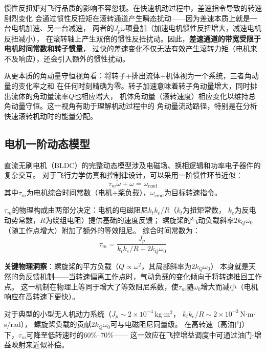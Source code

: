 惯性反扭矩对飞行品质的影响不容忽视。在快速机动过程中，差速指令导致的转速剧烈变化
会通过惯性反扭矩在滚转通道产生瞬态扰动——因为差速本质上就是一台电机加速、另一台减速，
两者的$J_p \dot{\omega}$项叠加（加速电机惯性反扭增大，减速电机反扭减小），
在滚转轴上产生双倍的惯性反扭扰动。因此，\textbf{差速通道的带宽受限于电机时间常数和转子惯量}，
过快的差速变化不仅无法有效产生滚转力矩（电机来不及响应），还会引入额外的惯性扰动。

从更本质的角动量守恒视角看：将转子+排出流体+机体视为一个系统，三者角动量的变化率之和
在任何时刻精确为零。转子加速意味着转子角动量增大，同时排出流体的角动量流率$Q$也相应增大，
机体角动量（滚转速度）相应变化以维持总角动量守恒。这一视角有助于理解机动过程中的
角动量流动路径，特别是在分析快速滚转机动时的能量分配。

\subsection{电机一阶动态模型}

直流无刷电机（BLDC）的完整动态模型涉及电磁场、换相逻辑和功率电子器件的复杂交互。
对于飞行力学仿真和控制律设计，可以采用一阶惯性环节近似\cite{ducard2011fault}：
\begin{equation}
    \tau_m \dot{\omega} + \omega = \omega_{\text{cmd}}
    \label{eq:motor_lag}
\end{equation}
其中$\tau_m$为电机综合时间常数（电机+桨负载），$\omega_{\text{cmd}}$为目标转速指令。

$\tau_m$的物理构成由两部分决定：电机的电磁阻尼$k_t k_e / R$（$k_t$为扭矩常数，
$k_e$为反电动势常数，$R$为绕组电阻）提供基础的速度反馈；
螺旋桨的气动负载斜率$2 k_Q \omega_0$（随工作点增大）附加了额外的等效阻尼。
综合时间常数为：
\begin{equation}
    \tau_m = \frac{J_p}{k_t k_e / R + 2 k_Q \omega_0}
    \label{eq:tau_m}
\end{equation}

\textbf{关键物理洞察}：螺旋桨的平方负载（$Q \propto \omega^2$，其局部斜率为$2 k_Q \omega_0$）
本身就是天然的负反馈机制——当转速偏离工作点时，气动负载的变化倾向于将转速推回工作点。
这一机制在物理上等同于增大了等效阻尼系数，使$\tau_m$随$\omega_0$增大而减小（电机响应在高转速下更快）。

对于典型的小型无人机动力系统（$J_p \sim 2 \times 10^{-4}$\,kg$\cdot$m$^2$，
$k_t k_e / R \sim 2 \times 10^{-3}$\,N$\cdot$m$\cdot$s/rad），
螺旋桨负载的贡献$2 k_Q \omega_0$可与电磁阻尼同量级。
在高转速（高油门）下，$\tau_m$可降至低转速时的$60\%$--$70\%$——
这一效应在飞控增益调度中可通过油门-增益映射来近似补偿。

